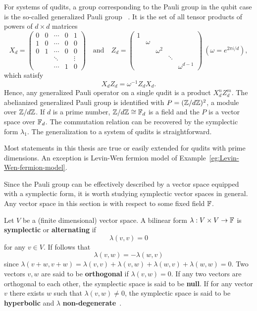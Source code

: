 \begin{rem}
For systems of qudits, a group corresponding to the Pauli group in the qubit case
is the so-called generalized Pauli group%
~\cite{Knill1996Non-binary,
Knill1996Group,
Rains1999Nonbinary,
Gottesman1999qudit}.
It is the set of all tensor products of powers of $d \times d$ matrices
\[
 X_d = 
\begin{pmatrix}
 0 & 0 & \cdots & 0 & 1     \\
 1 & 0 & \cdots & 0 & 0     \\
 0 & 1 & \cdots & 0 & 0     \\
   &   & \ddots &   & \vdots\\
   &   & \cdots & 1 & 0 
\end{pmatrix} 
\quad \text{and} \quad
Z_d = 
\begin{pmatrix}
 1 &        &         &        & \\
   & \omega &         &        & \\
   &        &\omega^2 &        & \\
   &        &         & \ddots & \\
   &        &         &        & \omega^{d-1}
\end{pmatrix} ~\left( \omega = e^{2\pi i/d} \right),
\]
which satisfy
\[
 X_d Z_d = \omega^{-1} Z_d X_d .
\]
Hence, any generalized Pauli operator on a single qudit is a product $X_d^n Z_d^m$.
The abelianized generalized Pauli group is identified with $P = (\mathbb{Z} / d \mathbb{Z})^2$, a module over $\mathbb{Z}/d\mathbb{Z}$.
If $d$ is a prime number, $\mathbb{Z}/ d \mathbb{Z} \cong \mathbb{F}_d$ is a field and the $P$ is a vector space over $\mathbb{F}_d$.
The commutation relation can be recovered by the symplectic form $\lambda_1$.
The generalization to a system of qudits is straightforward.

Most statements in this thesis are true or easily extended for qudits with prime dimensions.
An exception is Levin-Wen fermion model of Example~\ref{eg:Levin-Wen-fermion-model}.
\end{rem}


Since the Pauli group can be effectively described 
by a vector space equipped with a symplectic form,
it is worth studying symplectic vector spaces in general.
Any vector space in this section is with respect to some fixed field $\mathbb{F}$.

Let $V$ be a (finite dimensional) vector space. A bilinear form $\lambda : V \times V \to \mathbb{F}$ 
is {\bf symplectic} or {\bf alternating} if
\[
 \lambda( v, v ) = 0
\]
for any $v \in V$. If follows that
\[
 \lambda(v,w) = -\lambda(w,v)
\]
since $\lambda(v+w,v+w)= \lambda(v,v) + \lambda(v,w) + \lambda(w,v) + \lambda(w,w) = 0$.
Two vectors $v,w$ are said to be {\bf orthogonal} if $\lambda(v,w) = 0$.
If any two vectors are orthogonal to each other, the symplectic space is said to be {\bf null}.
If for any vector $v$ there exists $w$ such that $\lambda(v,w) \neq 0$,
the symplectic space is said to be {\bf hyperbolic} and $\lambda$ {\bf non-degenerate}~\cite{Lang}.

